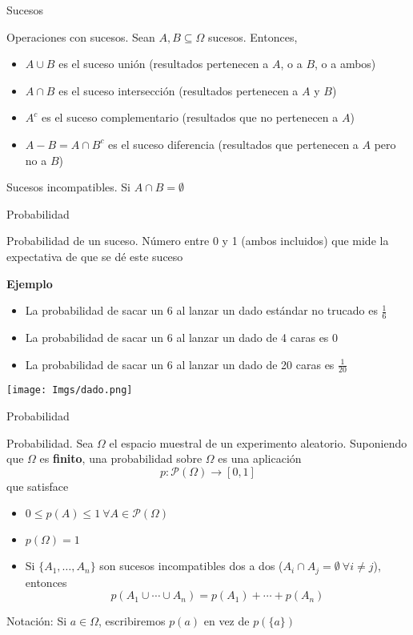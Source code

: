\documentclass[
  ignorenonframetext,
]{beamer}
\providecommand{\tightlist}{%
  \setlength{\itemsep}{0pt}\setlength{\parskip}{0pt}}
\begin{document}
\begin{frame}{Sucesos}
\protect\hypertarget{sucesos-1}{}

Operaciones con sucesos. Sean \(A,B\subseteq \Omega\) sucesos. Entonces,

\begin{itemize}
\tightlist
\item
  \(A\cup B\) es el suceso unión (resultados pertenecen a \(A\), o a
  \(B\), o a ambos)
\item
  \(A\cap B\) es el suceso intersección (resultados pertenecen a \(A\) y
  \(B\))
\item
  \(A^c\) es el suceso complementario (resultados que no pertenecen a
  \(A\))
\item
  \(A-B = A\cap B^c\) es el suceso diferencia (resultados que pertenecen
  a \(A\) pero no a \(B\))
\end{itemize}

Sucesos incompatibles. Si \(A\cap B = \emptyset\)

\end{frame}

\begin{frame}{Probabilidad}
\protect\hypertarget{probabilidad}{}

Probabilidad de un suceso. Número entre 0 y 1 (ambos incluidos) que mide
la expectativa de que se dé este suceso

\textbf{Ejemplo}

\begin{itemize}
\tightlist
\item
  La probabilidad de sacar un 6 al lanzar un dado estándar no trucado es
  \(\frac{1}{6}\)
\item
  La probabilidad de sacar un 6 al lanzar un dado de 4 caras es \(0\)
\item
  La probabilidad de sacar un 6 al lanzar un dado de 20 caras es
  \(\frac{1}{20}\)
\end{itemize}

\texttt{[image: Imgs/dado.png]}

\end{frame}

\begin{frame}{Probabilidad}
\protect\hypertarget{probabilidad-1}{}

Probabilidad. Sea \(\Omega\) el espacio muestral de un experimento
aleatorio. Suponiendo que \(\Omega\) es \textbf{finito}, una
probabilidad sobre \(\Omega\) es una aplicación
\[p: \mathcal{P}(\Omega)\longrightarrow [0,1]\] que satisface

\begin{itemize}
\tightlist
\item
  \(0\le p(A)\le 1 \ \forall A\in\mathcal{P}(\Omega)\)
\item
  \(p(\Omega) = 1\)
\item
  Si \(\{A_1,\dots,A_n\}\) son sucesos incompatibles dos a dos
  (\(A_i\cap A_j=\emptyset \ \forall i\ne j\)), entonces
  \[p(A_1\cup\cdots \cup A_n)=p(A_1)+\cdots+p(A_n)\]
\end{itemize}

Notación: Si \(a\in\Omega\), escribiremos \(p(a)\) en vez de
\(p(\{a\})\)

\end{frame}
\end{document}
